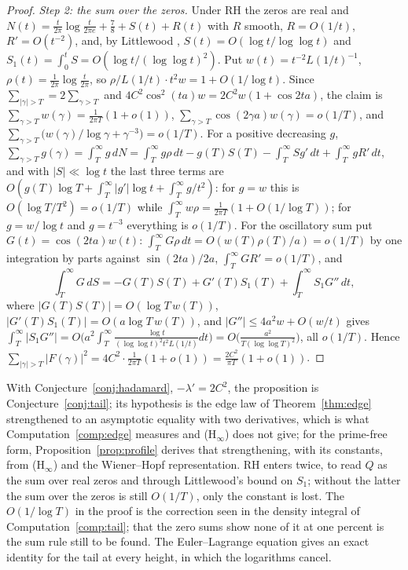 \documentclass[11pt]{article}
\theoremstyle{definition}
\theoremstyle{remark}
\begin{document}
\begin{proof}
\emph{Step 2: the sum over the zeros.} Under RH the zeros are real and $N(t)=\frac t{2\pi}\log\frac t{2\pi e}+\frac78+S(t)+R(t)$ with $R$ smooth, $R=O(1/t)$, $R'=O(t^{-2})$, and, by Littlewood \cite[Ch.\ XIV, \S14.13]{titchmarsh}, $S(t)=O(\log t/\log\log t)$ and $S_1(t)=\int_0^tS=O(\log t/(\log\log t)^2)$. Put $w(t)=t^{-2}L(1/t)^{-1}$, $\rho(t)=\frac1{2\pi}\log\frac t{2\pi}$, so $\rho/L(1/t)\cdot t^2w=1+O(1/\log t)$. Since $\sum_{|\gamma|>T}=2\sum_{\gamma>T}$ and $4C^2\cos^2(ta)w=2C^2w(1+\cos2ta)$, the claim is $\sum_{\gamma>T}w(\gamma)=\frac1{2\pi T}(1+o(1))$, $\sum_{\gamma>T}\cos(2\gamma a)w(\gamma)=o(1/T)$, and $\sum_{\gamma>T}\big(w(\gamma)/\log\gamma+\gamma^{-3}\big)=o(1/T)$. For a positive decreasing $g$, $\sum_{\gamma>T}g(\gamma)=\int_T^\infty g\,dN=\int_T^\infty g\rho\,dt-g(T)S(T)-\int_T^\infty Sg'\,dt+\int_T^\infty gR'\,dt$, and with $|S|\ll\log t$ the last three terms are $O(g(T)\log T+\int_T^\infty|g'|\log t+\int_T^\infty g/t^2)$: for $g=w$ this is $O(\log T/T^2)=o(1/T)$ while $\int_T^\infty w\rho=\frac1{2\pi T}(1+O(1/\log T))$; for $g=w/\log t$ and $g=t^{-3}$ everything is $o(1/T)$. For the oscillatory sum put $G(t)=\cos(2ta)w(t)$: $\int_T^\infty G\rho\,dt=O(w(T)\rho(T)/a)=o(1/T)$ by one integration by parts against $\sin(2ta)/2a$, $\int_T^\infty GR'=o(1/T)$, and
\[
\int_T^\infty G\,dS=-G(T)S(T)+G'(T)S_1(T)+\int_T^\infty S_1G''\,dt,
\]
where $|G(T)S(T)|=O(\log T\,w(T))$, $|G'(T)S_1(T)|=O(a\log T\,w(T))$, and $|G''|\le4a^2w+O(w/t)$ gives $\int_T^\infty|S_1G''|=O\big(a^2\int_T^\infty\frac{\log t}{(\log\log t)^2t^2L(1/t)}dt\big)=O\big(\frac{a^2}{T(\log\log T)^2}\big)$, all $o(1/T)$. Hence $\sum_{|\gamma|>T}|F(\gamma)|^2=4C^2\cdot\frac1{2\pi T}(1+o(1))=\frac{2C^2}{\pi T}(1+o(1))$.
\end{proof}

With Conjecture~\ref{conj:hadamard}, $-\lambda'=2C^2$, the proposition is Conjecture~\ref{conj:tail}; its hypothesis is the edge law of Theorem~\ref{thm:edge} strengthened to an asymptotic equality with two derivatives, which is what Computation~\ref{comp:edge} measures and (H$_\infty$) does not give; for the prime-free form, Proposition~\ref{prop:profile} derives that strengthening, with its constants, from (H$_\infty$) and the Wiener--Hopf representation. RH enters twice, to read $Q$ as the sum over real zeros and through Littlewood's bound on $S_1$; without the latter the sum over the zeros is still $O(1/T)$, only the constant is lost. The $O(1/\log T)$ in the proof is the correction seen in the density integral of Computation~\ref{comp:tail}; that the zero sums show none of it at one percent is the sum rule still to be found. The Euler--Lagrange equation gives an exact identity for the tail at every height, in which the logarithms cancel.
\end{document}
